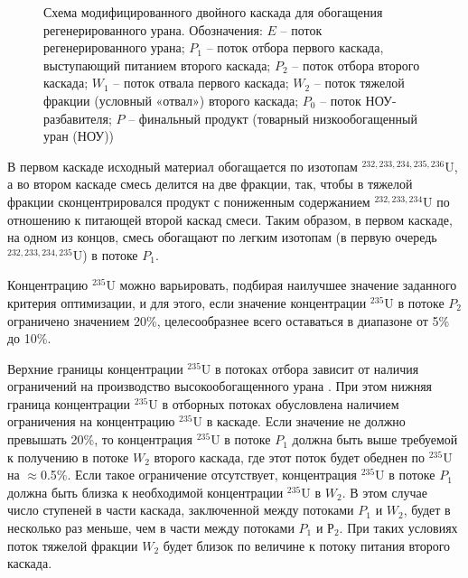 \begin{figure}[ht]
    \caption{Схема модифицированного двойного каскада для обогащения регенерированного урана. Обозначения: $E$ -- поток регенерированного урана; $P_1$ -- поток отбора первого каскада, выступающий питанием второго каскада; $P_2$ -- поток отбора второго каскада; $W_1$ -- поток отвала первого каскада; $W_2$ -- поток тяжелой фракции (условный «отвал») второго каскада; $P_0$ -- поток НОУ-разбавителя; $P$ -- финальный продукт (товарный низкообогащенный уран (НОУ))}\label{p2left}
\end{figure}


В первом каскаде исходный материал обогащается по изотопам $^{232,233,234,235,236}$U, а во втором каскаде смесь делится на две фракции, так, чтобы в тяжелой фракции сконцентрировался продукт с пониженным содержанием $^{232,233,234}$U по отношению к питающей второй каскад смеси. Таким образом, в первом каскаде, на одном из концов, смесь обогащают по легким изотопам (в первую очередь $^{232,233,234,235}$U) в потоке $P_1$.

Концентрацию $^{235}$U можно варьировать, подбирая наилучшее значение заданного критерия оптимизации, и для этого, если значение концентрации $^{235}$U в потоке $P_2$ ограничено значением 20\%, целесообразнее всего оставаться в диапазоне от 5\% до 10\%.

Верхние границы концентрации $^{235}$U в потоках отбора зависит от наличия ограничений на производство высокообогащенного урана \cite{brownOriginsSignificanceLimit2016}.
При этом нижняя граница концентрации $^{235}$U в отборных потоках обусловлена наличием ограничения на концентрацию $^{235}$U в каскаде. Если значение не должно превышать 20\%, то концентрация $^{235}$U в потоке $P_1$ должна быть выше требуемой к получению в потоке $W_2$ второго каскада, где этот поток будет обеднен по $^{235}$U на $\approx$0.5\%. Если такое ограничение отсутствует, концентрация $^{235}$U в потоке $P_1$ должна быть близка к необходимой концентрации $^{235}$U в $W_2$. В этом случае число ступеней в части каскада, заключенной между потоками $P_1$ и $W_2$, будет в несколько раз меньше, чем в части между потоками  $P_1$ и $Р_2$. При таких условиях поток тяжелой фракции $W_2$ будет близок по величине к потоку питания второго каскада.

